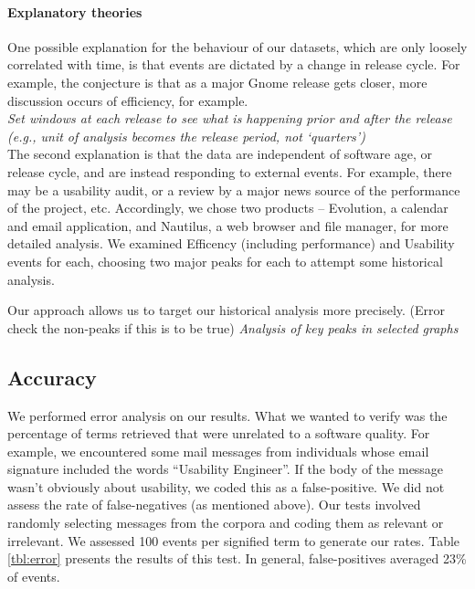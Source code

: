 \documentclass[conference, compsoc]{IEEEtran}
\begin{document}
\paragraph{Explanatory theories}
One possible explanation for the behaviour of our datasets, which are only loosely correlated with time, is that events are dictated by a change in release cycle. For example, the conjecture is that as a major Gnome release gets closer, more discussion occurs of efficiency, for example. \\
\emph{Set windows at each release to see what is happening prior and after the release (e.g., unit of analysis becomes the release period, not `quarters')}\\
The second explanation is that the data are independent of software age, or release cycle, and are instead responding to external events. For example, there may be a usability audit, or a review by a major news source of the performance of the project, etc. Accordingly, we chose two products -- Evolution, a calendar and email application, and Nautilus, a web browser and file manager, for more detailed analysis. We examined Efficency (including performance) and Usability events for each, choosing two major peaks for each to attempt some historical analysis. 

Our approach allows us to target our historical analysis more precisely. (Error check the non-peaks if this is to be true)
\emph{Analysis of key peaks in selected graphs}
\subsection{Accuracy}
We performed error analysis on our results. What we wanted to verify was the percentage of terms retrieved that were unrelated to a software quality. For example, we encountered some mail messages from individuals whose email signature included the words ``Usability Engineer''. If the body of the message wasn't obviously about usability, we coded this as a false-positive. We did not assess the rate of false-negatives (as mentioned above). Our tests involved randomly selecting messages from the corpora and coding them as relevant or irrelevant. We assessed 100 events per signified term to generate our rates. Table \ref{tbl:error} presents the results of this test. In general, false-positives averaged 23\% of events.
\end{document}
